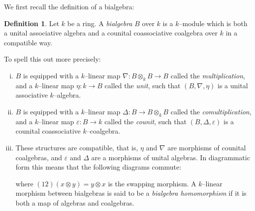 \documentclass{article}
\theoremstyle{plain}
\theoremstyle{definition}
\newtheorem{Def}[Th]{Definition}
\DeclareMathOperator{\id}{id}
\begin{document}
We first recall the definition of a bialgebra:
\begin{Def}
    Let $k$ be a ring. A \textit{bialgebra} $B$ over $k$ is a $k$--module which is both a unital associative algebra and a counital coassociative coalgebra over $k$ in a compatible way. 
    
    To spell this out more precisely: 
    \begin{enumerate}[(i)]
        \item $B$ is equipped with a $k$--linear map $\nabla\colon B\otimes_k B\to B $ called the \textit{multiplication}, and a $k$--linear map $\eta\colon k\to B$ called the \textit{unit}, such that $(B, \nabla, \eta)$ is a unital associative $k$--algebra.
        \item $B$ is equipped with a $k$--linear map $\Delta\colon B\to B \otimes_k B$ called the \textit{comultiplication}, and a $k$--linear map $\varepsilon\colon B\to k$ called the \textit{counit}, such that $(B, \Delta, \varepsilon)$ is a counital coassociative $k$--coalgebra.
        \item These structures are compatible, that is, $\eta$ and $\nabla$ are morphisms of counital coalgebras, and $\varepsilon$ and $\Delta$ are a morphisms of unital algebras. In diagrammatic form this means that the following diagrams commute:
\begin{center}
\end{center}
\begin{center}
\end{center}
where $(12)(x\otimes y)=y\otimes x$ is the swapping morphism. A $k$--linear morphism between bialgebras is said to be a \textit{bialgebra homomorphism} if it is both a map of algebras and coalgebras.
    \end{enumerate}


\end{Def}
\end{document}

